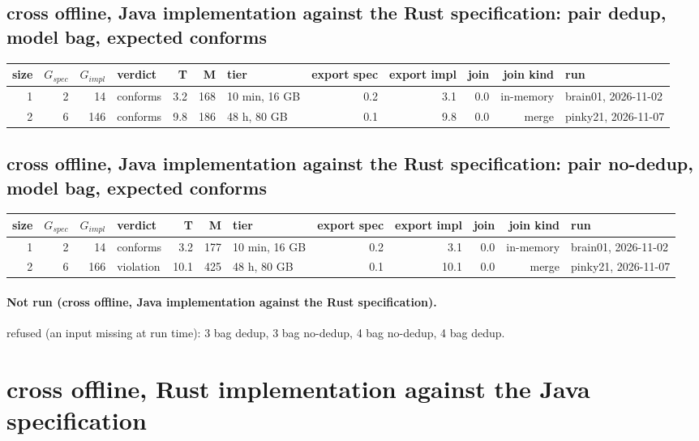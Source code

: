 \documentclass[10pt]{article}
\begin{document}
\subsection*{cross offline, Java implementation against the Rust specification: pair \textsf{dedup}, model bag, expected conforms}
\begin{longtable}{@{}rrrlrrlrrrrl@{}}
\toprule
size & $G_{\mathit{spec}}$ & $G_{\mathit{impl}}$ & verdict & T & M & tier & export spec & export impl & join & join kind & run \\
\midrule
\endhead
\color{red} 1 & 2 & 14 & conforms & 3.2 & 168 & 10 min, 16 GB & 0.2 & 3.1 & 0.0 & in-memory & brain01, 2026-11-02 \\
\color{red} 2 & 6 & 146 & conforms & 9.8 & 186 & 48 h, 80 GB & 0.1 & 9.8 & 0.0 & merge & pinky21, 2026-11-07 \\
\bottomrule
\end{longtable}
\subsection*{cross offline, Java implementation against the Rust specification: pair \textsf{no-dedup}, model bag, expected conforms}
\begin{longtable}{@{}rrrlrrlrrrrl@{}}
\toprule
size & $G_{\mathit{spec}}$ & $G_{\mathit{impl}}$ & verdict & T & M & tier & export spec & export impl & join & join kind & run \\
\midrule
\endhead
\color{red} 1 & 2 & 14 & conforms & 3.2 & 177 & 10 min, 16 GB & 0.2 & 3.1 & 0.0 & in-memory & brain01, 2026-11-02 \\
\color{red} 2 & 6 & 166 & violation & 10.1 & 425 & 48 h, 80 GB & 0.1 & 10.1 & 0.0 & merge & pinky21, 2026-11-07 \\
\bottomrule
\end{longtable}
\paragraph{Not run (cross offline, Java implementation against the Rust specification).}
refused (an input missing at run time): 3 bag dedup, 3 bag no-dedup, 4 bag no-dedup, 4 bag dedup.\par
\section*{cross offline, Rust implementation against the Java specification}
\end{document}
